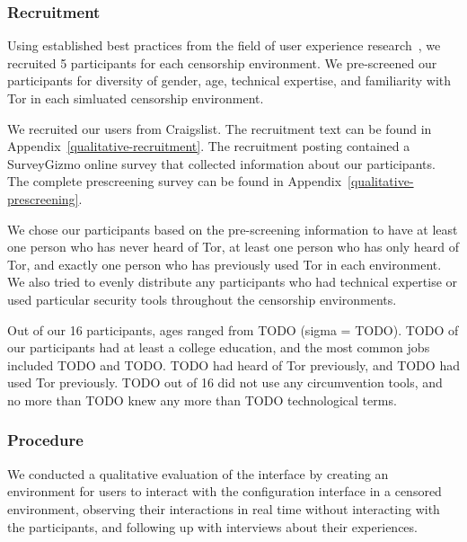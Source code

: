 \documentclass[USenglish,oneside,twocolumn]{article}
\begin{document}
\subsubsection{Recruitment}
Using established best practices from the field of user experience research~\cite{howmanyusers},
we recruited 5 participants for each censorship environment.
We pre-screened our participants for diversity of gender, age, technical expertise,
and familiarity with Tor in each simluated censorship environment. 

We recruited our users from Craigslist. The recruitment text can be found in 
Appendix~\ref{qualitative-recruitment}. The recruitment posting contained a 
SurveyGizmo online survey that collected information about our participants.
The complete prescreening survey can be found in Appendix~\ref{qualitative-prescreening}.  

We chose our participants based on the pre-screening information to have 
at least one person who has never heard of Tor, at least one person who has 
only heard of Tor, and exactly one person who has previously used Tor in each
environment. We also tried to evenly distribute any participants who had technical
expertise or used particular security tools throughout the censorship environments. 

Out of our 16 participants, ages ranged from {\color {red} TODO}
(sigma = {\color {red} TODO}). {\color {red} TODO} of our participants had at least
a college education, and the most common jobs included {\color {red} TODO} and
{\color {red} TODO}. {\color {red} TODO} had heard of Tor previously, 
and {\color {red} TODO} had used Tor previously. {\color {red} TODO} out of 
16 did not use any circumvention tools, and no more than {\color {red} TODO} 
knew any more than {\color {red} TODO} technological terms.


\subsubsection{Procedure}
We conducted a qualitative evaluation of the interface by creating an environment 
for users to interact with the configuration interface in a censored environment, 
observing their interactions in real time without interacting with the participants, 
and following up with interviews about their experiences.
\end{document}
